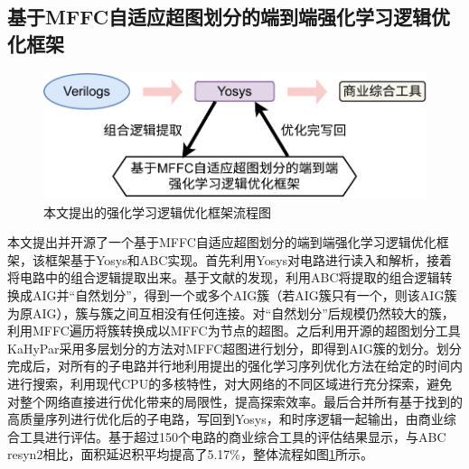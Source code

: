 \subsection{基于MFFC自适应超图划分的端到端强化学习逻辑优化框架}

\begin{figure}[!htbp]
    \centering
    \includegraphics[width=0.8\linewidth]{./figs/LS-MFFC_rl.pdf}
    \caption{本文提出的强化学习逻辑优化框架流程图}
    \label{LS:MFFC_rl}
\end{figure}

本文提出并开源了一个基于MFFC自适应超图划分的端到端强化学习逻辑优化框架，该框架基于Yosys\cite{LS:yosys}和ABC\cite{LS:ABC}实现。首先利用Yosys对电路进行读入和解析，接着将电路中的组合逻辑提取出来。基于文献\cite{Moucheng_Yang}的发现，利用ABC将提取的组合逻辑转换成AIG并“自然划分”，得到一个或多个AIG簇（若AIG簇只有一个，则该AIG簇为原AIG），簇与簇之间互相没有任何连接。对“自然划分”后规模仍然较大的簇，利用MFFC遍历将簇转换成以MFFC为节点的超图。之后利用开源的超图划分工具KaHyPar\cite{KaHyPar}采用多层划分的方法对MFFC超图进行划分，即得到AIG簇的划分。划分完成后，对所有的子电路并行地利用提出的强化学习序列优化方法在给定的时间内进行搜索，利用现代CPU的多核特性，对大网络的不同区域进行充分探索，避免对整个网络直接进行优化带来的局限性，提高探索效率。最后合并所有基于找到的高质量序列进行优化后的子电路，写回到Yosys，和时序逻辑一起输出，由商业综合工具进行评估。基于超过150个电路的商业综合工具的评估结果显示，与ABC resyn2相比，面积延迟积平均提高了5.17\%，整体流程如图\ref{LS:MFFC_rl}所示。


